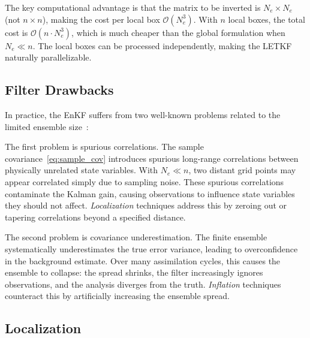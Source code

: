 The key computational advantage is that the matrix to be inverted is $N_e \times N_e$ (not $n \times n$), making the cost per local box $\mathcal{O}(N_e^3)$. With $n$ local boxes, the total cost is $\mathcal{O}(n \cdot N_e^3)$, which is much cheaper than the global formulation when $N_e \ll n$. The local boxes can be processed independently, making the LETKF naturally parallelizable.

\subsection{Filter Drawbacks}
\label{sec:filter_drawbacks}

In practice, the EnKF suffers from two well-known problems related to the limited ensemble size~\citep{houtekamer1998data, anderson2001ensemble}:

The first problem is spurious correlations. The sample covariance~\eqref{eq:sample_cov} introduces spurious long-range correlations between physically unrelated state variables. With $N_e \ll n$, two distant grid points may appear correlated simply due to sampling noise. These spurious correlations contaminate the Kalman gain, causing observations to influence state variables they should not affect. \emph{Localization} techniques address this by zeroing out or tapering correlations beyond a specified distance.

The second problem is covariance underestimation. The finite ensemble systematically underestimates the true error variance, leading to overconfidence in the background estimate. Over many assimilation cycles, this causes the ensemble to collapse: the spread shrinks, the filter increasingly ignores observations, and the analysis diverges from the truth. \emph{Inflation} techniques counteract this by artificially increasing the ensemble spread.

\subsection{Localization}
\label{sec:localization}

